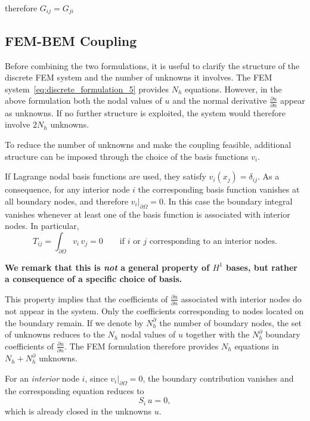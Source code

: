 \documentclass[11pt,onecolumn]{article}
\begin{document}
therefore $G_{ij} = G_{ji}$

\subsection{FEM-BEM Coupling}

Before combining the two formulations, it is useful to clarify the structure of the discrete FEM system and the number of unknowns it involves.  
The FEM system~\eqref{eq:discrete_formulation_5} provides $N_h$ equations. However, in the above formulation both the nodal values of $u$ and the normal derivative $\frac{\partial u}{\partial n}$ appear as unknowns. If no further structure is exploited, the system would therefore involve $2N_h$ unknowns.

To reduce the number of unknowns and make the coupling feasible, additional structure can be imposed through the choice of the basis functions $v_i$.

If Lagrange nodal basis functions are used, they satisfy $v_i(x_j)=\delta_{ij}$. As a consequence, for any interior node $i$ the corresponding basis function vanishes at all boundary nodes, and therefore $v_i|_{\partial\Omega}=0$. In this case the boundary integral vanishes whenever at least one of the basis function is associated with interior nodes. In particular,
\[
T_{ij} = \int_{\partial\Omega} v_i \, v_j = 0 
\qquad \text{if } i \text{ or } j \text{ corresponding to an interior nodes}.
\]

\textbf{We remark that this is \textit{not} a general property of $H^1$ bases, but rather a consequence of a specific choice of basis.} 

This property implies that the coefficients of $\frac{\partial u}{\partial n}$ associated with interior nodes do not appear in the system. Only the coefficients corresponding to nodes located on the boundary remain. If we denote by $N_h^{\partial}$ the number of boundary nodes, the set of unknowns reduces to the $N_h$ nodal values of $u$ together with the $N_h^{\partial}$ boundary coefficients of $\frac{\partial u}{\partial n}$. The FEM formulation therefore provides $N_h$ equations in $N_h + N_h^{\partial}$ unknowns.

For an \textit{interior} node $i$, since $v_i|_{\partial\Omega}=0$, the boundary contribution vanishes and the corresponding equation reduces to
\begin{equation}
S_i\, u = 0,
\label{eq:interior_row}
\end{equation}
which is already closed in the unknowns $u$.
\end{document}
